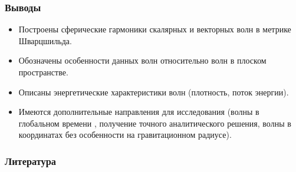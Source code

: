 \documentclass[compress, 9pt]{beamer}
\def\docroot{../..}
\begin{document}
    \begin{frame}\frametitle{Выводы}

        \begin{itemize}\justifying
            \item Построены сферические гармоники скалярных и векторных волн в метрике Шварцшильда.
            \item Обозначены особенности данных волн относительно волн в плоском пространстве.
            \item Описаны энергетические характеристики волн (плотность, поток энергии).
            \item Имеются дополнительные направления для исследования (волны в глобальном времени \cite{burlankov_space_dynamics}, получение точного аналитического решения, волны в координатах без особенности на гравитационном радиусе).
        \end{itemize}

    \end{frame}

    \begin{frame}\frametitle{Литература}

        {\tiny{
        
        
        }}

    \end{frame}
\end{document}
